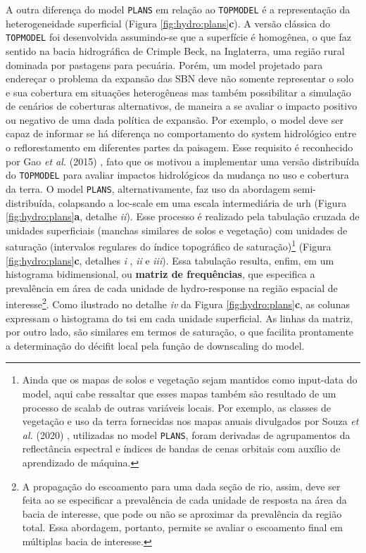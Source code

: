\documentclass[./main.tex]{subfiles}
\begin{document}
\par A outra diferença do \gls{model} \texttt{PLANS} em relação ao \texttt{TOPMODEL} é a representação da heterogeneidade superficial (Figura \ref{fig:hydro:plans}\textbf{c}). A versão clássica do \texttt{TOPMODEL} foi desenvolvida assumindo-se que a superfície é homogênea, o que faz sentido na bacia hidrográfica de Crimple Beck, na Inglaterra, uma região rural dominada por pastagens para pecuária. Porém, um \gls{model} projetado para endereçar o problema da expansão das SBN deve não somente representar o solo e sua cobertura em situações heterogêneas mas também possibilitar a simulação de cenários de coberturas alternativos, de maneira a se avaliar o impacto positivo ou negativo de uma dada política de expansão. Por exemplo, o \gls{model} deve ser capaz de informar se há diferença no comportamento do \gls{system} hidrológico entre o reflorestamento em diferentes partes da paisagem. Esse requisito é reconhecido por Gao \textit{et al.} (2015) \cite{Gao2015a}, fato que os motivou a implementar uma versão distribuída do \texttt{TOPMODEL} para avaliar impactos hidrológicos da mudança no uso e cobertura da terra. O \gls{model} \texttt{PLANS}, alternativamente, faz uso da abordagem semi-distribuída, colapsando a \gls{loc-scale} em uma escala intermediária de \gls{urh} (Figura \ref{fig:hydro:plans}\textbf{a}, detalhe \textit{ii}). Esse processo é realizado pela tabulação cruzada de unidades superficiais (manchas similares de solos e vegetação) com unidades de saturação (intervalos regulares do índice topográfico de saturação)\footnote{Ainda que os mapas de solos e vegetação sejam mantidos como \gls{input-data} do \gls{model}, aqui cabe ressaltar que esses mapas também são resultado de um processo de \gls{scalab} de outras variáveis locais. Por exemplo, as classes de vegetação e uso da terra fornecidas nos mapas anuais divulgados por Souza \textit{et al.} (2020) \cite{Souza2020a}, utilizadas no \gls{model} \texttt{PLANS}, foram derivadas de agrupamentos da reflectância espectral e índices de bandas de cenas orbitais com auxílio de aprendizado de máquina.} (Figura \ref{fig:hydro:plans}\textbf{c}, detalhes \textit{i} , \textit{ii} e \textit{iii}). Essa tabulação resulta, enfim, em um histograma bidimensional, ou \textbf{matriz de frequências}, que especifica a prevalência em área de cada unidade de \gls{hydro-response} na região espacial de interesse\footnote{A propagação do escoamento para uma dada seção de rio, assim, deve ser feita ao se especificar a prevalência de cada unidade de resposta na área da bacia de interesse, que pode ou não se aproximar da prevalência da região total. Essa abordagem, portanto, permite se avaliar o escoamento final em múltiplas bacia de interesse.}. Como ilustrado no detalhe \textit{iv} da Figura \ref{fig:hydro:plans}\textbf{c}, as colunas expressam o histograma do \gls{tsi} em cada unidade superficial. As linhas da matriz, por outro lado, são similares em termos de saturação, o que facilita prontamente a determinação do décifit local pela função de \gls{downscaling} do \gls{model}. 
\end{document}
